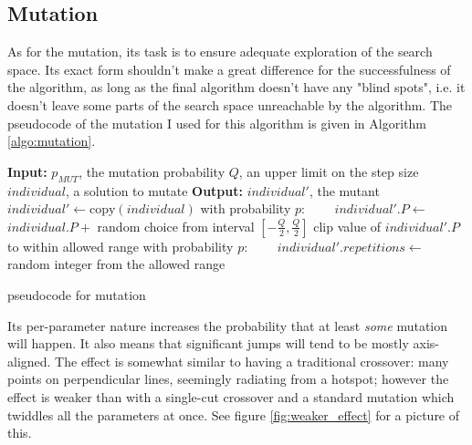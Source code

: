 \documentclass[times, utf8, diplomski]{fer}
\begin{document}
\subsection{Mutation}
As for the mutation, its task is to ensure adequate exploration of the search
space. Its exact form shouldn't make a great difference for the successfulness
of the algorithm, as long as the final algorithm doesn't have any "blind spots",
i.e. it doesn't leave some parts of the search space unreachable by the algorithm.
The pseudocode of the mutation I used for this algorithm is given in Algorithm \ref{algo:mutation}.

\begin{algorithm}[!htbp]
    \small
    \begin{algorithmic}
        \STATE \textbf{Input:} $p_{MUT}$, the mutation probability
        \STATE \textbf{\hphantom{Input:}} $Q$, an upper limit on the step size
        \STATE \textbf{\hphantom{Input:}} $individual$, a solution to mutate
        \STATE \textbf{Output:} $individual'$, the mutant
        \STATE $individual' \gets \text{copy}(individual)$
            \STATE with probability $p$:
            \STATE ~~~~$individual'.P \gets $ $individual.P + $ random choice from interval $[-\frac{Q}{2}, \frac{Q}{2}]$
            \STATE clip value of $individual'.P$ to within allowed range
        \ENDFOR
        \STATE with probability $p$:
        \STATE ~~~~$individual'.repetitions \gets $ random integer from the allowed range
    \end{algorithmic}
    \caption{pseudocode for mutation}
    \label{algo:mutation}
\end{algorithm}


Its per-parameter nature increases the probability that at least \emph{some}
mutation will happen. It also means that significant jumps will tend to be mostly
axis-aligned. The effect is somewhat similar to having a traditional crossover:
many points on perpendicular lines, seemingly radiating from a hotspot; however
the effect is weaker than with a single-cut crossover and a standard mutation
which twiddles all the parameters at once. See figure \ref{fig:weaker_effect}
for a picture of this.
\end{document}
